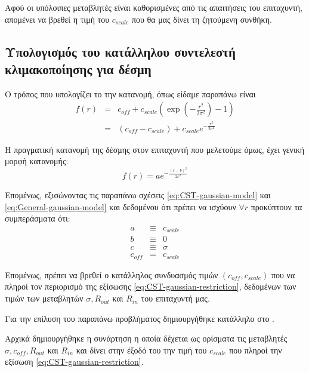 Αφού οι υπόλοιπες μεταβλητές είναι καθορισμένες από τις απαιτήσεις του επιταχυντή, απομένει να βρεθεί η τιμή του $c_{scale}$ που θα μας δίνει τη ζητούμενη συνθήκη.

\subsection{Υπολογισμός του κατάλληλου συντελεστή κλιμακοποίησης για  δέσμη}

Ο τρόπος που υπολογίζει το  την  κατανομή, όπως είδαμε παραπάνω είναι
\begin{eqnarray}\label{eq:CST-gaussian-model}
f(r) &= & 	c_{off} + c_{scale} \left( \exp \left(-\frac{r^2}{2\sigma^2}\right) - 1 \right) \nonumber \\
&= &\left(c_{off} - c_{scale}\right) + c_{scale} e^{-\frac{r^2}{2\sigma^2}}
\end{eqnarray}

Η πραγματική κατανομή της δέσμης στον επιταχυντή που μελετούμε όμως, έχει γενική μορφή κατανομής:
\begin{equation}\label{eq:General-gaussian-model}
 f(r) = a e^{-\frac{\left(r-b\right)^2}{2c^2}}
\end{equation}

Επομένως, εξισώνοντας τις παραπάνω σχέσεις \ref{eq:CST-gaussian-model} και \ref{eq:General-gaussian-model} και δεδομένου ότι πρέπει να ισχύουν $\forall r$ προκύπτουν τα συμπεράσματα ότι:
\begin{eqnarray}
a &\equiv & c_{scale}\nonumber \\
b &\equiv &0\nonumber \\
c &\equiv & \sigma \nonumber \\
c_{off} &=&  c_{scale} 
\end{eqnarray}

Επομένως, πρέπει να βρεθεί ο κατάλληλος συνδυασμός τιμών $\left(c_{off}, c_{scale}\right)$ που να πληροί τον περιορισμό της εξίσωσης \ref{eq:CST-gaussian-restriction}, δεδομένων των τιμών των μεταβλητών $\sigma, R_{out}$ και $R_{in}$ του επιταχυντή μας.

Για την επίλυση του παραπάνω προβλήματος δημιουργήθηκε κατάλληλο  στο . 

Αρχικά δημιουργήθηκε η συνάρτηση  η οποία δέχεται ως ορίσματα τις μεταβλητές $\sigma, c_{off}, R_{out}$ και $R_{in}$ και δίνει στην έξοδό του την τιμή του $c_{scale}$ που πληροί την εξίσωση \ref{eq:CST-gaussian-restriction}.

